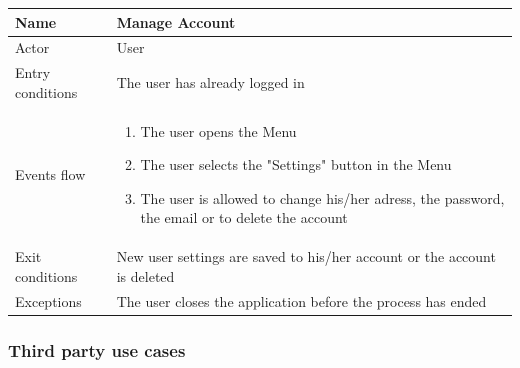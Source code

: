 \documentclass{article}
\begin{document}
\begin{table}[H]
    \begin{tabular}{|l|l|}
    \hline
    Name & \begin{minipage}[t]{0.7\textwidth} \textbf{Manage Account} \end{minipage} \\ \hline  
     Actor & \begin{minipage}[t]{0.7\textwidth} User \end{minipage} \\ \hline 
     Entry conditions & \begin{minipage}[t]{0.7\textwidth} The user has already logged in \end{minipage} \\
     \hline 
     Events flow & \begin{minipage}[t]{0.7\textwidth} 
    \begin{enumerate}
        \item The user opens the Menu
        \item The user selects the "Settings" button in the Menu
        \item The user is allowed to change his/her adress, the password, the
        email or to delete the account
    \end{enumerate}    
    \end{minipage} \\ \hline
     Exit conditions & \begin{minipage}[t]{0.7\textwidth} New user settings are
     saved to his/her account or the account is deleted \end{minipage} \\
     \hline
     Exceptions & \begin{minipage}[t]{0.7\textwidth} The user closes the
     application before the process has ended \end{minipage} \\ \hline
    \end{tabular}
\end{table}

\subsubsection{Third party use cases}
\end{document}
